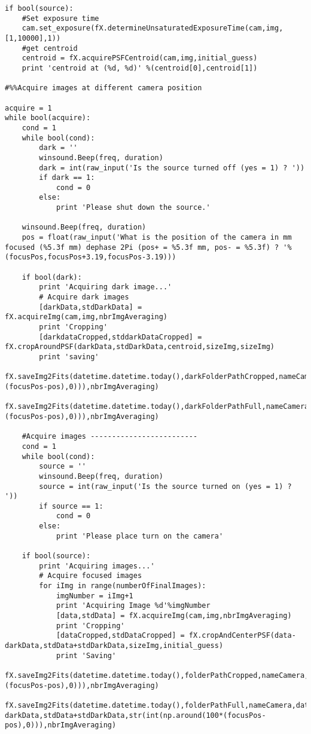 \begin{lstlisting}
if bool(source):
    #Set exposure time
    cam.set_exposure(fX.determineUnsaturatedExposureTime(cam,img,[1,10000],1))
    #get centroid
    centroid = fX.acquirePSFCentroid(cam,img,initial_guess)
    print 'centroid at (%d, %d)' %(centroid[0],centroid[1])

#%%Acquire images at different camera position

acquire = 1
while bool(acquire):
    cond = 1
    while bool(cond):
        dark = ''
        winsound.Beep(freq, duration)
        dark = int(raw_input('Is the source turned off (yes = 1) ? '))
        if dark == 1:
            cond = 0
        else:
            print 'Please shut down the source.'

    winsound.Beep(freq, duration)
    pos = float(raw_input('What is the position of the camera in mm focused (%5.3f mm) dephase 2Pi (pos+ = %5.3f mm, pos- = %5.3f) ? '%(focusPos,focusPos+3.19,focusPos-3.19)))

    if bool(dark):
        print 'Acquiring dark image...'
        # Acquire dark images
        [darkData,stdDarkData] = fX.acquireImg(cam,img,nbrImgAveraging)
        print 'Cropping'
        [darkdataCropped,stddarkDataCropped] = fX.cropAroundPSF(darkData,stdDarkData,centroid,sizeImg,sizeImg)
        print 'saving'        
        fX.saveImg2Fits(datetime.datetime.today(),darkFolderPathCropped,nameCamera,darkdataCropped,stddarkDataCropped,str(int(np.around(100*(focusPos-pos),0))),nbrImgAveraging)
        fX.saveImg2Fits(datetime.datetime.today(),darkFolderPathFull,nameCamera,darkData,stdDarkData,str(int(np.around(100*(focusPos-pos),0))),nbrImgAveraging)

    #Acquire images -------------------------
    cond = 1
    while bool(cond):
        source = ''
        winsound.Beep(freq, duration)
        source = int(raw_input('Is the source turned on (yes = 1) ? '))
        if source == 1:
            cond = 0
        else:
            print 'Please place turn on the camera'

    if bool(source):
        print 'Acquiring images...'
        # Acquire focused images
        for iImg in range(numberOfFinalImages):
            imgNumber = iImg+1
            print 'Acquiring Image %d'%imgNumber
            [data,stdData] = fX.acquireImg(cam,img,nbrImgAveraging)
            print 'Cropping'
            [dataCropped,stdDataCropped] = fX.cropAndCenterPSF(data-darkData,stdData+stdDarkData,sizeImg,initial_guess)
            print 'Saving'
            fX.saveImg2Fits(datetime.datetime.today(),folderPathCropped,nameCamera,dataCropped,stdDataCropped,str(int(np.around(100*(focusPos-pos),0))),nbrImgAveraging)
            fX.saveImg2Fits(datetime.datetime.today(),folderPathFull,nameCamera,data-darkData,stdData+stdDarkData,str(int(np.around(100*(focusPos-pos),0))),nbrImgAveraging)


\end{lstlisting}
